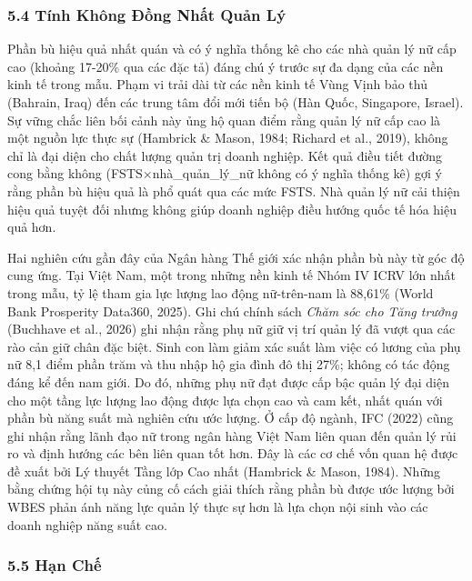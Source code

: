 \documentclass[12pt,a4paper]{article}
\begin{document}
\hypertarget{54-tuxednh-khuxf4ng-ux111ux1ed3ng-nhux1ea5t-quux1ea3n-luxfd}{%
\subsubsection{5.4 Tính Không Đồng Nhất Quản
Lý}\label{54-tuxednh-khuxf4ng-ux111ux1ed3ng-nhux1ea5t-quux1ea3n-luxfd}}

Phần bù hiệu quả nhất quán và có ý nghĩa thống kê cho các nhà quản lý nữ
cấp cao (khoảng 17-20\% qua các đặc tả) đáng chú ý trước sự đa dạng của
các nền kinh tế trong mẫu. Phạm vi trải dài từ các nền kinh tế Vùng Vịnh
bảo thủ (Bahrain, Iraq) đến các trung tâm đổi mới tiến bộ (Hàn Quốc,
Singapore, Israel). Sự vững chắc liên bối cảnh này ủng hộ quan điểm rằng
quản lý nữ cấp cao là một nguồn lực thực sự (Hambrick \& Mason, 1984;
Richard et al., 2019), không chỉ là đại diện cho chất lượng quản trị
doanh nghiệp. Kết quả điều tiết đường cong bằng không
(FSTS×nhà\_quản\_lý\_nữ không có ý nghĩa thống kê) gợi ý rằng phần bù
hiệu quả là phổ quát qua các mức FSTS. Nhà quản lý nữ cải thiện hiệu quả
tuyệt đối nhưng không giúp doanh nghiệp điều hướng quốc tế hóa hiệu quả
hơn.

Hai nghiên cứu gần đây của Ngân hàng Thế giới xác nhận phần bù này từ
góc độ cung ứng. Tại Việt Nam, một trong những nền kinh tế Nhóm IV ICRV
lớn nhất trong mẫu, tỷ lệ tham gia lực lượng lao động nữ-trên-nam là
88,61\% (World Bank Prosperity Data360, 2025). Ghi chú chính sách
\emph{Chăm sóc cho Tăng trưởng} (Buchhave et al., 2026) ghi nhận rằng
phụ nữ giữ vị trí quản lý đã vượt qua các rào cản giữ chân đặc biệt.
Sinh con làm giảm xác suất làm việc có lương của phụ nữ 8,1 điểm phần
trăm và thu nhập hộ gia đình đô thị 27\%; không có tác động đáng kể đến
nam giới. Do đó, những phụ nữ đạt được cấp bậc quản lý đại diện cho một
tầng lực lượng lao động được lựa chọn cao và cam kết, nhất quán với phần
bù năng suất mà nghiên cứu ước lượng. Ở cấp độ ngành, IFC (2022) cũng
ghi nhận rằng lãnh đạo nữ trong ngân hàng Việt Nam liên quan đến quản lý
rủi ro và định hướng các bên liên quan tốt hơn. Đây là các cơ chế vốn
quan hệ được đề xuất bởi Lý thuyết Tầng lớp Cao nhất (Hambrick \& Mason,
1984). Những bằng chứng hội tụ này củng cố cách giải thích rằng phần bù
được ước lượng bởi WBES phản ánh năng lực quản lý thực sự hơn là lựa
chọn nội sinh vào các doanh nghiệp năng suất cao.

\hypertarget{55-hux1ea1n-chux1ebf}{%
\subsubsection{5.5 Hạn Chế}\label{55-hux1ea1n-chux1ebf}}
\end{document}

